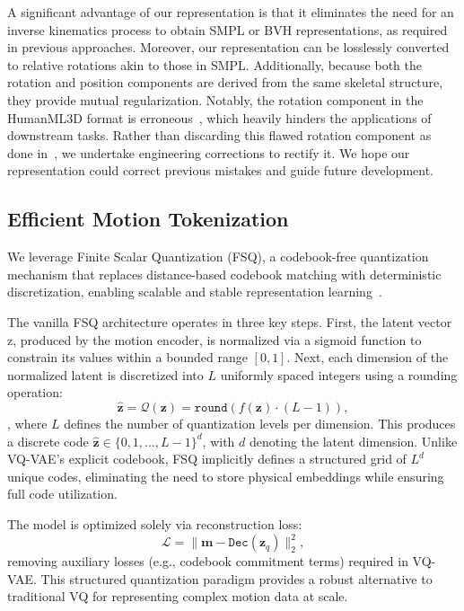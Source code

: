 A significant advantage of our representation is that it eliminates the need for an inverse kinematics process to obtain SMPL or BVH representations, as required in previous approaches. Moreover, our representation can be losslessly converted to relative rotations akin to those in SMPL. Additionally, because both the rotation and position components are derived from the same skeletal structure, they provide mutual regularization. Notably, the rotation component in the HumanML3D format is erroneous~\cite{humanmlissue}, which heavily hinders the applications of downstream tasks. Rather than discarding this flawed rotation component as done in~\cite{meng2024rethinking}, we undertake engineering corrections to rectify it. We hope our representation could correct previous mistakes and guide future development.


\subsection{Efficient Motion Tokenization}
We leverage Finite Scalar Quantization (FSQ), a codebook-free quantization mechanism that replaces distance-based codebook matching with deterministic discretization, enabling scalable and stable representation learning~\citep{lu2024scamo}.  

The vanilla FSQ architecture operates in three key steps. First, the latent vector z, produced by the motion encoder, is normalized via a sigmoid function to constrain its values within a bounded range \([0, 1]\). Next, each dimension of the normalized latent is discretized into \(L\) uniformly spaced integers using a rounding operation:  
\vspace{-0.5em}
\begin{equation}
\hat{\mathbf{z}} = \mathcal{Q}(\mathbf{z}) = \mathtt{round}\left(f(\mathbf{z}) \cdot (L-1)\right),
\end{equation},
where \(L\) defines the number of quantization levels per dimension. This produces a discrete code \(\hat{\mathbf{z}} \in \{0, 1, \dots, L-1\}^d\), with \(d\) denoting the latent dimension. Unlike VQ-VAE’s explicit codebook, FSQ implicitly defines a structured grid of \(L^d\) unique codes, eliminating the need to store physical embeddings while ensuring full code utilization.  

The model is optimized solely via reconstruction loss:  
\begin{equation}
\mathcal{L} = \|\mathbf{m} - \mathtt{Dec}(\mathbf{z}_q)\|_2^2,
\end{equation}
removing auxiliary losses (e.g., codebook commitment terms) required in VQ-VAE.  
This structured quantization paradigm provides a robust alternative to traditional VQ for representing complex motion data at scale.

